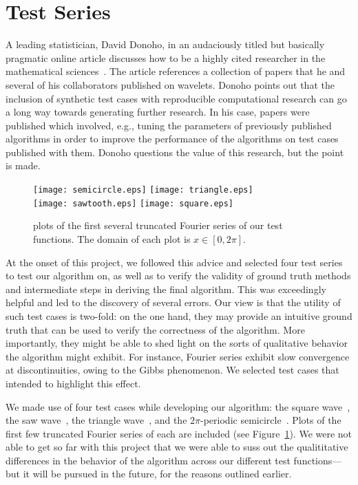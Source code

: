 \section{Test Series}

A leading statistician, David Donoho, in an audaciously titled but
basically pragmatic online article discusses how to be a highly cited
researcher in the mathematical
sciences~\cite{online:how-to-be-highly-cited}. The article references
a collection of papers that he and several of his collaborators
published on wavelets. Donoho points out that the inclusion of
synthetic test cases with reproducible computational research can go a
long way towards generating further research. In his case, papers were
published which involved, e.g., tuning the parameters of previously
published algorithms in order to improve the performance of the
algorithms on test cases published with them. Donoho questions the
value of this research, but the point is made.

\begin{figure}[h]
  \centering
  \texttt{[image: semicircle.eps]} \texttt{[image: triangle.eps]} \\
  \texttt{[image: sawtooth.eps]} \texttt{[image: square.eps]} \\
  \caption{plots of the first several truncated Fourier series of our
    test functions. The domain of each plot is $x \in [0, 2\pi]$.}
  \label{fig:test-series}
\end{figure}

At the onset of this project, we followed this advice and selected
four test series to test our algorithm on, as well as to verify the
validity of ground truth methods and intermediate steps in deriving
the final algorithm. This was exceedingly helpful and led to the
discovery of several errors. Our view is that the utility of such test
cases is two-fold: on the one hand, they may provide an intuitive
ground truth that can be used to verify the correctness of the
algorithm. More importantly, they might be able to shed light on the
sorts of qualitative behavior the algorithm might exhibit. For
instance, Fourier series exhibit slow convergence at discontinuities,
owing to the Gibbs phenomenon. We selected test cases that intended to
highlight this effect.

We made use of four test cases while developing our algorithm: the
square wave~\cite{online:mathworld-fourier-series-square}, the saw
wave~\cite{online:mathworld-fourier-series-sawtooth}, the triangle
wave~\cite{online:mathworld-fourier-series-triangle}, and the
$2\pi$-periodic
semicircle~\cite{online:mathworld-fourier-series-semicircle}. Plots of
the first few truncated Fourier series of each are included (see
Figure~\ref{fig:test-series}). We were not able to get so far with
this project that we were able to suss out the qualititative
differences in the behavior of the algorithm across our different test
functions\----but it will be pursued in the future, for the reasons
outlined earlier.

